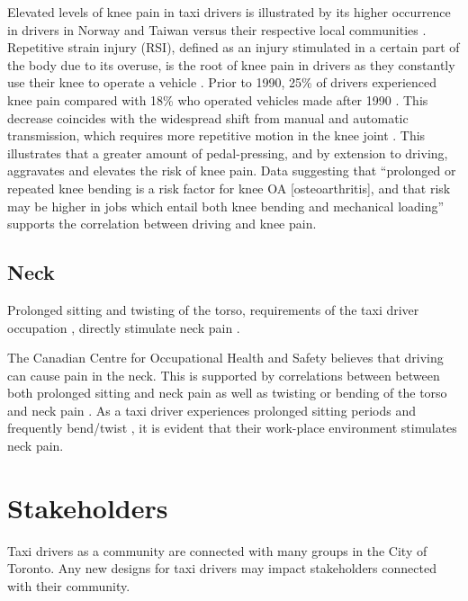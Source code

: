 \documentclass[11pt]{article}
\begin{document}
Elevated levels of knee pain in taxi drivers is illustrated by its higher occurrence in drivers 
in Norway and Taiwan versus their respective local communities \cite{KneePain}. Repetitive strain 
injury (RSI), defined as an injury stimulated in a certain part of the body due to its overuse, is the 
root of knee pain in drivers \cite{RSI} as they constantly use their knee to operate a vehicle 
\cite{KneePain}. Prior to 1990, 25\% of drivers experienced knee pain compared with 18\% who 
operated vehicles made after 1990 \cite{KneePain}. This decrease coincides with the widespread shift from 
manual and automatic transmission, which requires more repetitive motion in the knee joint 
\cite{KneePain}. This illustrates that a greater amount of pedal-pressing, and by extension to 
driving, aggravates and elevates the risk of knee pain. Data suggesting that “prolonged or repeated 
knee bending is a risk factor for knee OA [osteoarthritis], and that risk may be higher in jobs which 
entail both knee bending and mechanical loading” \cite{Osteoarthritis} supports the correlation 
between driving and knee pain.



\subsection{Neck}
Prolonged sitting and twisting of the torso, requirements of the taxi driver occupation \cite{neck}, 
directly stimulate neck pain \cite{neck}. 

The Canadian Centre for Occupational Health and Safety believes that driving can cause pain in the 
neck\cite{proof}. This is supported by correlations between between both prolonged sitting and neck pain as well as  
twisting or bending of the torso and neck pain \cite{neck}. 
As a taxi driver experiences prolonged sitting periods and frequently bend/twist \cite{Okunribido2008, POSTULATED},
it is evident that their work-place environment stimulates neck pain. 

\section{Stakeholders}
\label{sec:stake}
Taxi drivers as a community are connected with many groups in the City
of Toronto. Any new designs for taxi drivers may impact
stakeholders connected with their community.
 
\end{document}
